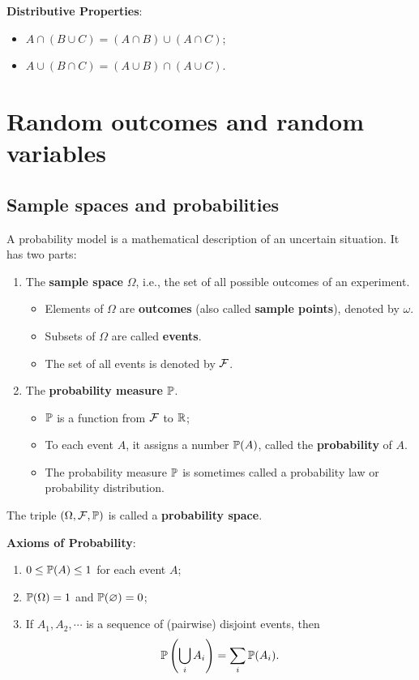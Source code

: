   \textbf{Distributive Properties}:
  \begin{itemize}
  \item $A\cap (B\cup C) = (A\cap B) \cup (A\cap C)$;
  \item $A\cup (B\cap C) = (A\cup B)\cap (A\cup C)$.
  \end{itemize}
  

\section{Random outcomes and random variables }
\label{sec:rand-outc-rand}
  \subsection{Sample spaces and probabilities}
  \label{subsec:1.1}
  \begin{definition}
    A probability model is a mathematical description of an uncertain situation.
    It has two parts:
    \begin{enumerate}
    \item The \textbf{sample space} $\Omega$, i.e., the set of all possible
      outcomes of an experiment.
      \begin{itemize}
      \item Elements of $\Omega$ are \textbf{outcomes} (also called
        \textbf{sample points}), denoted by $\omega$.
      \item Subsets of $\Omega$ are called \textbf{events}.
      \item The set of all events is denoted by $\mathcal{F}$.
      \end{itemize}
    \item The \textbf{probability measure} $\mathbb{P}$.
      \begin{itemize}
      \item $\mathbb{P}$ is a function from $\mathcal{F}$ to $\mathbb{R}$;
      \item To each event $A$, it assigns a number $\mathbb{P}(A)$, called
        the \textbf{probability} of $A$.
      \item The probability measure $\mathbb{P}$ is sometimes called a probability law or
        probability distribution.
      \end{itemize}
    \end{enumerate}
    The triple $(\Omega, \mathcal{F}, \mathbb{P})$ is called a \textbf{probability space}.
  \end{definition}
  \vspace{1em}
  \textbf{Axioms of Probability}:
  \begin{enumerate}
  \item $0\le \mathbb{P}(A)\le 1$ for each event $A$;
  \item $\mathbb{P}(\Omega) = 1$ and $\mathbb{P}(\varnothing) =0$;
  \item If $A_1, A_2, \cdots$ is a sequence of (pairwise) disjoint events, then
    \begin{equation}
      \label{eq:additivity}
      \mathbb{P}\left( \bigcup_i A_i \right) = \sum_i \mathbb{P}(A_i).
    \end{equation}
  \end{enumerate}


